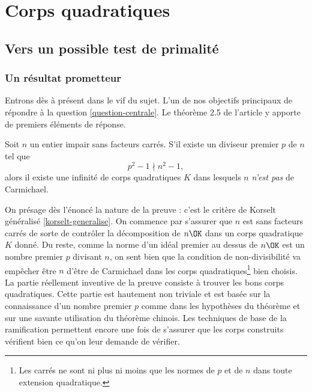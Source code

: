 \section{Corps quadratiques}

\subsection{Vers un possible test de primalité}

\subsubsection{Un résultat prometteur}

Entrons dès à présent dans le vif du sujet. L'un de nos objectifs principaux de répondre à la question \ref{question-centrale}. Le théorème 2.5 de l'article y apporte de premiers éléments de réponse.

\begin{theoreme}
	Soit $n$ un entier impair sans facteurs carrés. S'il existe un diviseur premier $p$ de $n$ tel que $$p^2 - 1 \nmid n^2 - 1,$$ alors il existe une infinité de corps quadratiques $K$ dans lesquels $n$ \emph{n'est pas} de Carmichael.
\end{theoreme}

\begin{MotSurPreuve}
	On présage dès l'énoncé la nature de la preuve : c'est le critère de Korselt généralisé \ref{korselt-generalise}. On commence par s'assurer que $n$ est sans facteurs carrés de sorte de contrôler la décomposition de $n\OK$ dans un corps quadratique $K$ donné. Du reste, comme la norme d'un idéal premier au dessus de $n\OK$ est un nombre premier $p$ divisant $n$, on sent bien que la condition de non-divisibilité va empêcher être $n$ d'être de Carmichael dans les corps quadratiques\footnote{Les carrés ne sont ni plus ni moins que les normes de $p$ et de $n$ dans toute extension quadratique.} bien choisis. La partie réellement inventive de la preuve consiste à trouver les bons corps quadratiques. Cette partie est hautement non triviale et est basée sur la connaissance d'un nombre premier $p$ comme dans les hypothèses du théorème et sur une savante utilisation du théorème chinois. Les techniques de base de la ramification permettent encore une fois de s'assurer que les corps construits vérifient bien ce qu'on leur demande de vérifier. \\
\end{MotSurPreuve}

